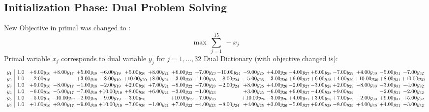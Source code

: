 \documentclass[9pt]{article}
\begin{document}
\subsection{Initialization Phase: Dual Problem Solving}
New Objective in primal was changed to : \[ \max\ \sum_{j=1}^{15}\ - x_j \] 
Primal variable $x_j$ corresponds to dual variable $y_j$ for $j = 1,\ldots,32$
Dual Dictionary (with objective changed is): 
\[\begin{array}{c| c c@{\hskip 2pt} c@{\hskip 2pt} c@{\hskip 2pt} c@{\hskip 2pt} c@{\hskip 2pt} c@{\hskip 2pt} c@{\hskip 2pt} c@{\hskip 2pt} c@{\hskip 2pt} c@{\hskip 2pt} c@{\hskip 2pt} c@{\hskip 2pt} c@{\hskip 2pt} c@{\hskip 2pt} c@{\hskip 2pt} c@{\hskip 2pt} c@{\hskip 2pt} }
 y_{1}   &  1.0 & +  8.00 y_{16} & +  8.00 y_{17} & +  5.00 y_{18} & +  6.00 y_{19} & +  5.00 y_{20} & +  8.00 y_{21} & +  6.00 y_{22} & +  7.00 y_{23} & -10.00 y_{24} & -9.00 y_{25} & +  4.00 y_{26} & -4.00 y_{27} & +  6.00 y_{28} & -7.00 y_{29} & +  4.00 y_{30} & -5.00 y_{31} & -7.00 y_{32}\\
 y_{2}   &  1.0 & -2.00 y_{16} &   & +  3.00 y_{18} & -8.00 y_{19} & + 10.00 y_{20} & +  8.00 y_{21} & -3.00 y_{22} & -1.00 y_{23} & -8.00 y_{24} & -5.00 y_{25} & -3.00 y_{26} & +  9.00 y_{27} & +  6.00 y_{28} & +  4.00 y_{29} & + 10.00 y_{30} & +  8.00 y_{31} & + 10.00 y_{32}\\
 y_{3}   &  1.0 & +  9.00 y_{16} & -8.00 y_{17} & -1.00 y_{18} & -2.00 y_{19} & +  2.00 y_{20} & +  7.00 y_{21} & -8.00 y_{22} & -7.00 y_{23} & -2.00 y_{24} & +  8.00 y_{25} & +  4.00 y_{26} & -2.00 y_{27} & -3.00 y_{28} & +  2.00 y_{29} & -8.00 y_{30} & -3.00 y_{31} & -4.00 y_{32}\\
 y_{4}   &  1.0 & -6.00 y_{16} & -5.00 y_{17} & -7.00 y_{18} & + 10.00 y_{19} & +  8.00 y_{20} & +  6.00 y_{21} & -3.00 y_{22} & -1.00 y_{23} &   & +  3.00 y_{25} & -6.00 y_{26} & +  9.00 y_{27} & -4.00 y_{28} & +  9.00 y_{29} &   & -2.00 y_{31} & -2.00 y_{32}\\
 y_{5}   &  1.0 & -5.00 y_{16} & -10.00 y_{17} & -2.00 y_{18} & -9.00 y_{19} & -3.00 y_{20} &   & + 10.00 y_{22} & -7.00 y_{23} &   & + 10.00 y_{25} & -3.00 y_{26} & +  4.00 y_{27} & +  3.00 y_{28} & +  7.00 y_{29} & -2.00 y_{30} & +  9.00 y_{31} & +  5.00 y_{32}\\
 y_{6}   &  1.0 & +  1.00 y_{16} & +  9.00 y_{17} & -9.00 y_{18} & + 10.00 y_{19} & -7.00 y_{20} & -1.00 y_{21} & +  7.00 y_{22} & -4.00 y_{23} & -8.00 y_{24} & +  4.00 y_{25} & +  3.00 y_{26} & -5.00 y_{27} & +  9.00 y_{28} & -8.00 y_{29} & +  4.00 y_{30} & +  4.00 y_{31} & -3.00 y_{32}\\

\end{array}\]
\end{document}
